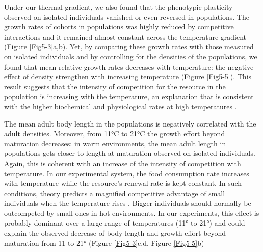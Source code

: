 Under our thermal gradient, we also found that the phenotypic plasticity
observed on isolated individuals vanished or even reversed in populations. The
growth rates of cohorts in populations was highly reduced by competitive
interactions and it remained almost constant across the temperature gradient
(Figure \ref{Fig5-3}a,b). Yet, by comparing these growth rates with those measured on
isolated individuals and by controlling for the densities of the populations, we
found that mean relative growth rates decreases with temperature: the negative
effect of density strengthen with increasing temperature (Figure \ref{Fig5-5}).
This result suggests that the intensity of competition for the resource in the population is
increasing with the temperature, an explanation that is consistent with the
higher biochemical and physiological rates at high
temperatures \autocites{gillooly2002a}.

The mean adult body length in the populations is negatively correlated with the
adult densities. Moreover, from 11°C to 21°C the growth effort beyond maturation
decreases: in warm environments, the mean adult length in populations gets
closer to length at maturation observed on isolated individuals. Again, this is
coherent with an increase of the intensity of competition with temperature. In
our experimental system, the food consumption rate increases with temperature
while the resource's renewal rate is kept constant. In such conditions, theory
predicts a magnified competitive advantage of small individuals when the
temperature rises \autocites{ohlberger2011a}. Bigger individuals
should normally be outcompeted by small ones in hot environments. In our experiments, this effect
is probably dominant over a large range of temperatures (11° to 21°) and could
explain the observed decrease of body length and growth effort beyond maturation
from 11 to 21° (Figure \ref{Fig5-3}c,d, Figure \ref{Fig5-5}b)

